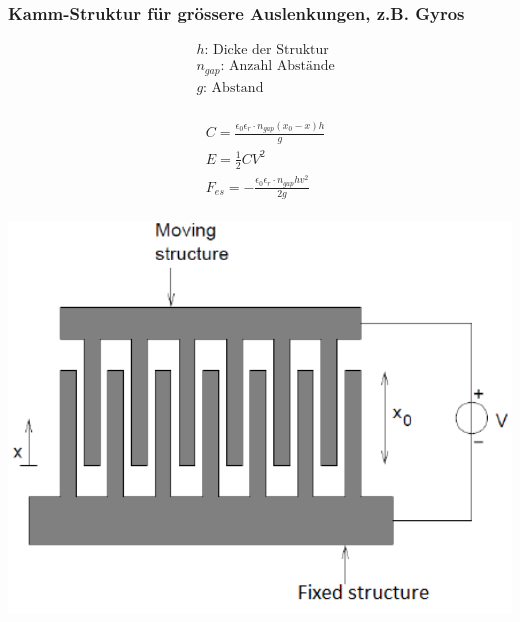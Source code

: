 \subsubsection{Kamm-Struktur für grössere Auslenkungen, z.B. Gyros}
\begin{minipage}{0.3\textwidth}
\vspace{-0.5cm}
  \begin{equation*}
    \begin{split} 
      &h\text{:       Dicke der Struktur}\\
      &n_{gap}\text{: Anzahl Abstände}\\
      &g\text{:       Abstand}\\
    \end{split} 
  \end{equation*}
\end{minipage}
\begin{minipage}{0.3\textwidth}
\vspace{-0.5cm}
  \begin{equation*} 
    \begin{split} 
      &C=\frac{\epsilon_0 \epsilon_r\cdot n_{gap}(x_0-x)h}{g}\\
      &E=\frac{1}{2}CV^2\\
      &F_{es}=-\frac{\epsilon_0 \epsilon_r \cdot n_{gap} h v^2}{2g}\\
    \end{split} 
  \end{equation*}
\end{minipage}
\begin{minipage}{0.3\textwidth}
    \vspace{-0.7cm}
    \includegraphics[width=1.2\textwidth]{images/Kamm_Strukt}
\end{minipage}

